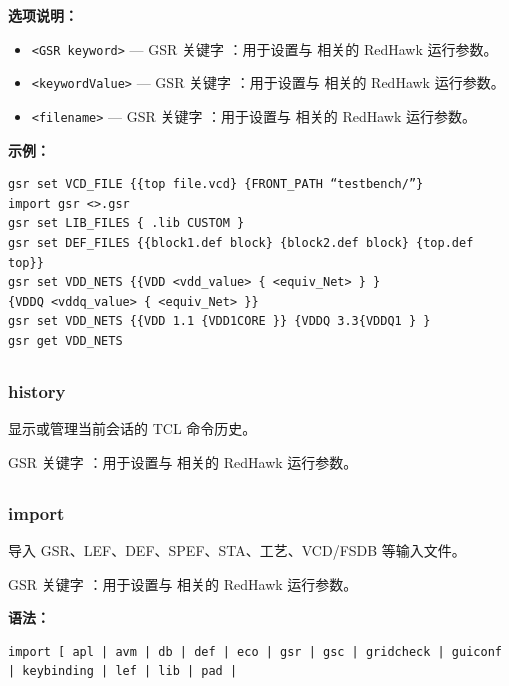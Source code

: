 \textbf{选项说明：}
\begin{itemize}
\item \texttt{<GSR keyword>} — GSR 关键字 ：用于设置与  相关的 RedHawk 运行参数。
\item \texttt{<keywordValue>} — GSR 关键字 ：用于设置与  相关的 RedHawk 运行参数。
\item \texttt{<filename>} — GSR 关键字 ：用于设置与  相关的 RedHawk 运行参数。
\end{itemize}

\textbf{示例：}
\begin{lstlisting}
gsr set VCD_FILE {{top file.vcd} {FRONT_PATH “testbench/”}
import gsr <>.gsr
gsr set LIB_FILES { .lib CUSTOM }
gsr set DEF_FILES {{block1.def block} {block2.def block} {top.def top}}
gsr set VDD_NETS {{VDD <vdd_value> { <equiv_Net> } }
{VDDQ <vddq_value> { <equiv_Net> }}
gsr set VDD_NETS {{VDD 1.1 {VDD1CORE }} {VDDQ 3.3{VDDQ1 } }
gsr get VDD_NETS
\end{lstlisting}

\subsection{}
\subsubsection*{history}

显示或管理当前会话的 TCL 命令历史。

GSR 关键字 ：用于设置与  相关的 RedHawk 运行参数。

\subsection{}
\subsubsection*{import}

导入 GSR、LEF、DEF、SPEF、STA、工艺、VCD/FSDB 等输入文件。

GSR 关键字 ：用于设置与  相关的 RedHawk 运行参数。

\textbf{语法：}
\begin{lstlisting}
import [ apl | avm | db | def | eco | gsr | gsc | gridcheck | guiconf | keybinding | lef | lib | pad |
\end{lstlisting}

